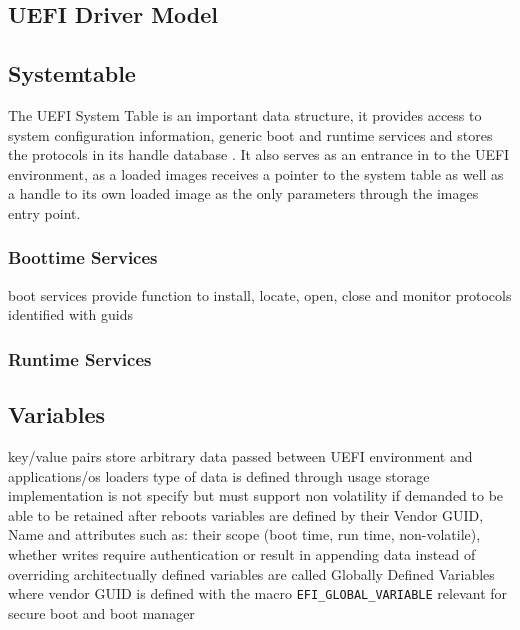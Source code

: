 \subsection{\ac{UEFI} Driver Model}


\subsection{Systemtable}
The UEFI System Table is an important data structure, it provides access to system configuration information, generic boot and runtime services and stores the protocols in its handle database \cite[3.3]{tianocore-edk2-driver-writer-s-guide}.
It also serves as an entrance in to the \ac{UEFI} environment, as a loaded images receives a pointer to the system table as well as a handle to its own loaded image as the only parameters through the images entry point.

\subsubsection{Boottime Services}
\cite[2.4 Protocols]{uefi-spec}
boot services provide function to install, locate, open, close and monitor protocols
\cite[7.3 Protocol Handler Services]{uefi-spec}
identified with guids
\subsubsection{Runtime Services}

\subsection{Variables}
key/value pairs
store arbitrary data passed between UEFI environment and applications/os loaders
type of data is defined through usage
storage implementation is not specify but must support non volatility if demanded to be able to be retained after reboots
variables are defined by their Vendor GUID, Name and attributes such as: their scope (boot time, run time, non-volatile), whether writes require authentication or result in appending data instead of overriding
\cite[8.2]{uefi-spec}
architectually defined variables are called Globally Defined Variables where vendor GUID is defined with the macro \lstinline{EFI_GLOBAL_VARIABLE}
\label{sec:uefi-pi:uefi:variables}
\cite[3.3]{uefi-spec}
relevant for secure boot and boot manager

